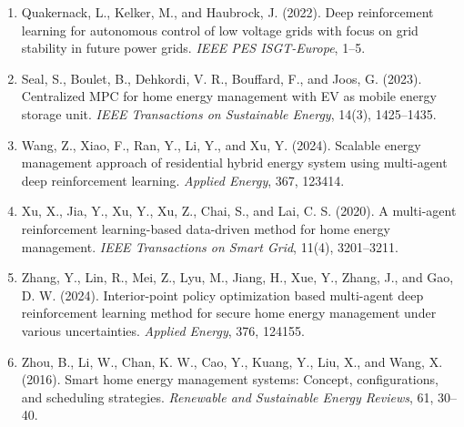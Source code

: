 \documentclass[12pt,a4paper]{ctexart}
\begin{document}
\begin{enumerate}
  \item Quakernack, L., Kelker, M., and Haubrock, J. (2022). Deep reinforcement learning for autonomous control of low voltage grids with focus on grid stability in future power grids. \textit{IEEE PES ISGT-Europe}, 1--5.
  \item Seal, S., Boulet, B., Dehkordi, V. R., Bouffard, F., and Joos, G. (2023). Centralized MPC for home energy management with EV as mobile energy storage unit. \textit{IEEE Transactions on Sustainable Energy}, 14(3), 1425--1435.
  \item Wang, Z., Xiao, F., Ran, Y., Li, Y., and Xu, Y. (2024). Scalable energy management approach of residential hybrid energy system using multi-agent deep reinforcement learning. \textit{Applied Energy}, 367, 123414.
  \item Xu, X., Jia, Y., Xu, Y., Xu, Z., Chai, S., and Lai, C. S. (2020). A multi-agent reinforcement learning-based data-driven method for home energy management. \textit{IEEE Transactions on Smart Grid}, 11(4), 3201--3211.
  \item Zhang, Y., Lin, R., Mei, Z., Lyu, M., Jiang, H., Xue, Y., Zhang, J., and Gao, D. W. (2024). Interior-point policy optimization based multi-agent deep reinforcement learning method for secure home energy management under various uncertainties. \textit{Applied Energy}, 376, 124155.
  \item Zhou, B., Li, W., Chan, K. W., Cao, Y., Kuang, Y., Liu, X., and Wang, X. (2016). Smart home energy management systems: Concept, configurations, and scheduling strategies. \textit{Renewable and Sustainable Energy Reviews}, 61, 30--40.
\end{enumerate}
\end{document}
